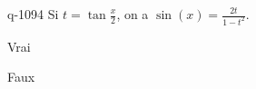 \begin{truefalse}{q-1094}
Si $t=\tan\frac{x}{2}$, on a $\sin(x)=\frac{2t}{1-t^2}$.
\item Vrai
\item* Faux
\end{truefalse}

